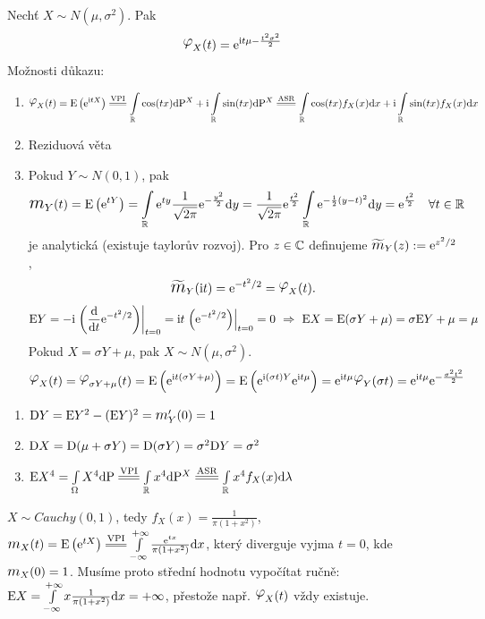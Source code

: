 \begin{example}
	Nechť $X\sim N(\mu,\sigma^2)$. Pak \[
	\lphi_X(t)=\me^{\mi t\mu-\frac{t^2\sigma^2}{2}}
	\]
	Možnosti důkazu:
	\begin{enumerate}
		\item $$\lphi_X(t)=\E \left(\me^{\mi  tX} \right)\equal{\text{VPI}}\int\limits_{\R} \cos(tx)\dif \PP^X+\mi  \int\limits_{\R}  \sin(tx)\dif \PP^X\equal{\text{ASR}}\int\limits_{\R} \cos(tx)f_X(x)\dif x+\mi  \int\limits_{\R} \sin(tx)f_X(x)\dif x$$
		\item Reziduová věta 
		\item Pokud $Y\sim N(0,1)$, pak $$\m_Y(t)=\E \left( \me^{tY} \right)=\int\limits_{\R}\me^{ty}\frac{1}{\sqrt{2\pi}}\me^{-\frac{y^2}{2}}\dif y= \frac{1}{\sqrt{2\pi}}\me^{\frac{t^2}{2}}\int\limits_{\R}\me^{-\frac{1}{2}(y-t)^2}\dif y=\me^{\frac{t^2}{2}} ~~~\forall t\in\R$$ je analytická (existuje taylorův rozvoj). Pro $z\in\mathbb{C}$ definujeme $\widetilde{\m}_Y(z):=\me^{z^2/2}$,
		$$\widetilde{\m}_Y(\mi t)=\me^{-t^2/2}=\lphi_X(t).$$
	 $$ \mathrm{E} Y=-\mathrm{i} \left.\left(\frac{\mathrm{d}}{\mathrm{d} t} \mathrm{e}^{-t^2/2} \right)\right|_{t=0}=\mathrm{i}  t \left.\left(\mathrm{e}^{-t^2/2}\right)\right|_{t=0}=0 ~\Rightarrow~ \mathrm{E} X=\mathrm{E} (\sigma Y+\mu)=\sigma \mathrm{E} Y+\mu=\mu$$
		Pokud $X=\sigma Y + \mu $, pak $ X\sim N(\mu,\sigma^2)$.
		$$ \lphi_X(t)=\lphi_{\sigma Y + \mu}(t)=\E \left( \me^{\mi  t(\sigma Y+\mu)} \right)=\E \left( \me^{\mi (\sigma t)Y}\me^{\mi  t \mu} \right)=\me^{\mi  t \mu}\lphi_Y(\sigma t)=\me^{\mi  t \mu}\me^{-\frac{\sigma^2t^2}{2}} $$
	\end{enumerate}
\end{example}
\begin{remark}
	\begin{enumerate}
		\item 	$ \D Y=\E Y^2-(\E Y)^2=\m'_Y(0)=1 $
		\item $ \mathrm{D} X=\mathrm{D} (\mu+\sigma Y)=\mathrm{D} (\sigma Y)=\sigma^2 \mathrm{D} Y=\sigma^2 $
		\item $ \E X^4=\int\limits_{\Omega} X^4\dif \PP\equal{\text{VPI}}\int\limits_{\R}x^4 \dif \PP^X\equal{\text{ASR}}\int\limits_{\R} x^4 f_X(x)\dif\lambda $
	\end{enumerate}
\end{remark}
\begin{example}
	$X\sim Cauchy(0,1)$, tedy $f_X(x)=\frac{1}{\pi(1+x^2)}$, $\m_X(t)=\E \left( \me^{tX} \right)\equal{\text{VPI}}\int\limits_{-\infty}^{+\infty}\frac{\me^{tx}}{\pi(1+x^2)}\dif x$, který diverguje vyjma $t=0$, kde $\m_X(0)=1$. Musíme proto střední hodnotu vypočítat ručně:
	$ \mathrm{E} X=\int\limits_{-\infty}^{+\infty}x\frac{1}{\pi(1+x^2)}\mathrm{d} x=+\infty $, přestože např. $\lphi_X(t)$ vždy existuje.
\end{example}

